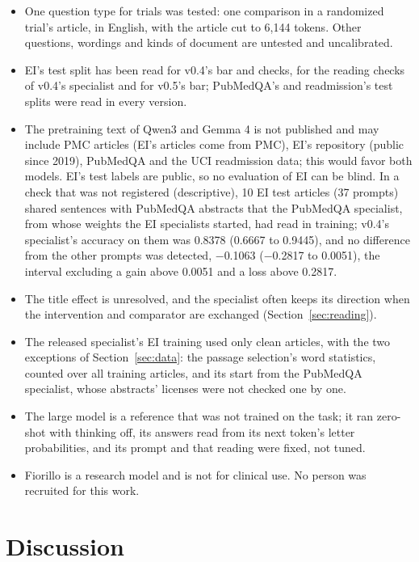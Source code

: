 \documentclass[11pt,letterpaper]{article}
\begin{document}
\begin{itemize}\setlength{\itemsep}{1pt}
\item One question type for trials was tested: one comparison in a randomized trial's article, in English, with the article cut to 6,144 tokens. Other questions, wordings and kinds of document are untested and uncalibrated.
\item EI's test split has been read for v0.4's bar and checks, for the reading checks of v0.4's specialist and for v0.5's bar; PubMedQA's and readmission's test splits were read in every version.
\item The pretraining text of Qwen3 and Gemma 4 is not published and may include PMC articles (EI's articles come from PMC), EI's repository (public since 2019), PubMedQA and the UCI readmission data; this would favor both models. EI's test labels are public, so no evaluation of EI can be blind. In a check that was not registered (descriptive), 10 EI test articles (37 prompts) shared sentences with PubMedQA abstracts that the PubMedQA specialist, from whose weights the EI specialists started, had read in training; v0.4's specialist's accuracy on them was 0.8378 (0.6667 to 0.9445), and no difference from the other prompts was detected, $-$0.1063 ($-$0.2817 to 0.0051), the interval excluding a gain above 0.0051 and a loss above 0.2817.
\item The title effect is unresolved, and the specialist often keeps its direction when the intervention and comparator are exchanged (Section~\ref{sec:reading}).
\item The released specialist's EI training used only clean articles, with the two exceptions of Section~\ref{sec:data}: the passage selection's word statistics, counted over all training articles, and its start from the PubMedQA specialist, whose abstracts' licenses were not checked one by one.
\item The large model is a reference that was not trained on the task; it ran zero-shot with thinking off, its answers read from its next token's letter probabilities, and its prompt and that reading were fixed, not tuned.
\item Fiorillo is a research model and is not for clinical use. No person was recruited for this work.
\end{itemize}

\section{Discussion}
\label{sec:discussion}
\end{document}
